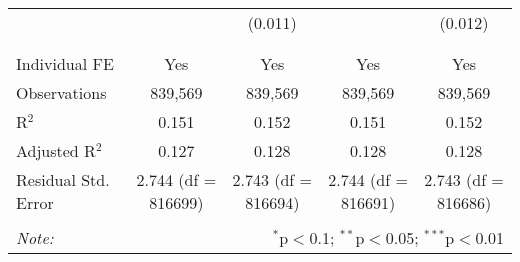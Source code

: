 \documentclass[
]{article}
\begin{document}
\begin{table}[!htbp]
{\begin{tabular}{@{\extracolsep{5pt}}lcccc}
  &  & (0.011) &  & (0.012) \\ 
  & & & & \\ 
\hline \\[-1.8ex] 
Individual FE & Yes & Yes & Yes & Yes \\ 
Observations & 839,569 & 839,569 & 839,569 & 839,569 \\ 
R$^{2}$ & 0.151 & 0.152 & 0.151 & 0.152 \\ 
Adjusted R$^{2}$ & 0.127 & 0.128 & 0.128 & 0.128 \\ 
Residual Std. Error & 2.744 (df = 816699) & 2.743 (df = 816694) & 2.744 (df = 816691) & 2.743 (df = 816686) \\ 
\hline 
\hline \\[-1.8ex] 
\textit{Note:}  & \multicolumn{4}{r}{$^{*}$p$<$0.1; $^{**}$p$<$0.05; $^{***}$p$<$0.01} \\ 
\end{tabular}
} 
\end{table}
\end{document}
